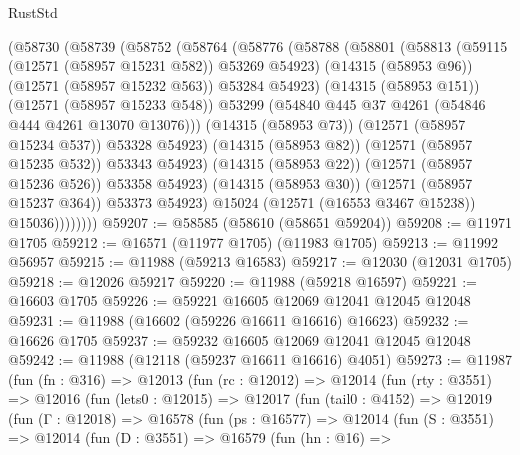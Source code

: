 \begin{lexlean}{RustStd}
\begin{coremodule}
                (@58730
                  (@58739
                    (@58752
                      (@58764
                        (@58776
                          (@58788
                            (@58801
                              (@58813
                                (@59115 (@12571 (@58957 @15231 @582)) @53269 @54923)
                                (@14315 (@58953 @96))
                                (@12571 (@58957 @15232 @563))
                                @53284
                                @54923)
                              (@14315 (@58953 @151))
                              (@12571 (@58957 @15233 @548))
                              @53299
                              (@54840 @445 @37 @4261 (@54846 @444 @4261 @13070 @13076)))
                            (@14315 (@58953 @73))
                            (@12571 (@58957 @15234 @537))
                            @53328
                            @54923)
                          (@14315 (@58953 @82))
                          (@12571 (@58957 @15235 @532))
                          @53343
                          @54923)
                        (@14315 (@58953 @22))
                        (@12571 (@58957 @15236 @526))
                        @53358
                        @54923)
                      (@14315 (@58953 @30))
                      (@12571 (@58957 @15237 @364))
                      @53373
                      @54923)
                    @15024
                    (@12571 (@16553 @3467 @15238))
                    @15036))))))))
@59207 := @58585 (@58610 (@58651 @59204))
@59208 := @11971 @1705
@59212 := @16571 (@11977 @1705) (@11983 @1705)
@59213 := @11992 @56957
@59215 := @11988 (@59213 @16583)
@59217 := @12030 (@12031 @1705)
@59218 := @12026 @59217
@59220 := @11988 (@59218 @16597)
@59221 := @16603 @1705
@59226 := @59221 @16605 @12069 @12041 @12045 @12048
@59231 := @11988 (@16602 (@59226 @16611 @16616) @16623)
@59232 := @16626 @1705
@59237 := @59232 @16605 @12069 @12041 @12045 @12048
@59242 := @11988 (@12118 (@59237 @16611 @16616) @4051)
@59273 := @11987
    (fun (fn : @316) =>
    @12013
      (fun (rc : @12012) =>
      @12014
        (fun (rty : @3551) =>
        @12016
          (fun (lets0 : @12015) =>
          @12017
            (fun (tail0 : @4152) =>
            @12019
              (fun (Γ : @12018) =>
              @16578
                (fun (ps : @16577) =>
                @12014
                  (fun (S : @3551) =>
                  @12014
                    (fun (D : @3551) =>
                    @16579
                      (fun (hn : @16) =>

\end{coremodule}
\end{lexlean}
